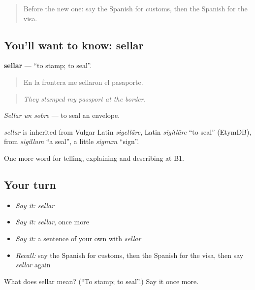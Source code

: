 \begin{quote}
Before the new one: say the Spanish for customs, then the Spanish for the visa.
\end{quote}

\subsection*{You'll want to know: sellar}
\textbf{sellar} — \textquotedblleft{}to stamp; to seal\textquotedblright{}.

\begin{quote}
En la frontera me sellaron el pasaporte.
\end{quote}

\begin{quote}
\emph{They stamped my passport at the border.}
\end{quote}

\emph{Sellar un sobre} — to seal an envelope.

\begin{cousinweb}
\emph{sellar} is inherited from Vulgar Latin \emph{sigellāre}, Latin \emph{sigillāre} \textquotedblleft{}to seal\textquotedblright{} (EtymDB), from \emph{sigillum} \textquotedblleft{}a seal\textquotedblright{}, a little \emph{signum} \textquotedblleft{}sign\textquotedblright{}.
\end{cousinweb}

\begin{grammarlens}[title={What you've built}]
One more word for telling, explaining and describing at B1.
\end{grammarlens}

\subsection*{Your turn}
\begin{itemize}
\raggedright
  \item \emph{Say it:} \emph{sellar}
  \item \emph{Say it:} \emph{sellar}, once more
  \item \emph{Say it:} a sentence of your own with \emph{sellar}
  \item \emph{Recall:} say the Spanish for customs, then the Spanish for the visa, then say \emph{sellar} again
\end{itemize}

\begin{tcolorbox}[breakable,colback=teal!4,colframe=teal!35!black,title={Before you move on}]
What does sellar mean? (\textquotedblleft{}To stamp; to seal\textquotedblright{}.) Say it once more.
\end{tcolorbox}
